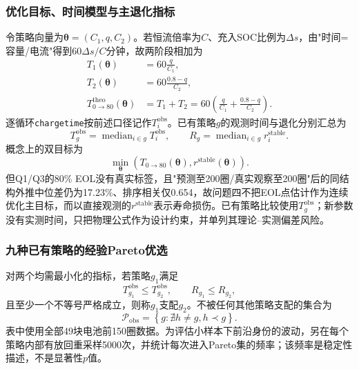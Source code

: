 \documentclass[withoutpreface]{cumcmthesis}
\begin{document}
\subsubsection{优化目标、时间模型与主退化指标}

令策略向量为$\boldsymbol\theta=(C_1,q,C_2)$。若恒流倍率为$C$、充入SOC比例为$\Delta s$，由"时间=容量/电流"得到$60\Delta s/C$分钟，故两阶段相加为
\begin{align}
T_1(\boldsymbol\theta)&=60\frac{q}{C_1},\\
T_2(\boldsymbol\theta)&=60\frac{0.8-q}{C_2},\\
T_{0\rightarrow80}^{\mathrm{theo}}(\boldsymbol\theta)
&=T_1+T_2
=60\left(\frac{q}{C_1}+\frac{0.8-q}{C_2}\right).
\end{align}
逐循环\texttt{chargetime}按前述口径记作$T_{i}^{\mathrm{obs}}$。已有策略$g$的观测时间与退化分别汇总为
\begin{equation}
T_g^{\mathrm{obs}}=\operatorname{median}_{i\in g}T_i^{\mathrm{obs}},
\qquad
R_g=\operatorname{median}_{i\in g}r_i^{\mathrm{stable}}.
\end{equation}
概念上的双目标为
\begin{equation}
\min_{\boldsymbol\theta}\left(
T_{0\rightarrow80}(\boldsymbol\theta),
r^{\mathrm{stable}}(\boldsymbol\theta)
\right).
\end{equation}
但Q1/Q3的80\% EOL没有真实标签，且"预测至200圈/真实观察至200圈"后的同结构外推中位差仍为17.23\%、排序相关仅0.654，故问题四不把EOL点估计作为连续优化主目标，而以直接观测的$r^{\mathrm{stable}}$表示寿命损伤。已有策略比较使用$T_g^{\mathrm{obs}}$；新参数没有实测时间，只把物理公式作为设计约束，并单列其理论--实测偏差风险。

\subsubsection{九种已有策略的经验Pareto优选}

对两个均需最小化的指标，若策略$g_1$满足
\begin{equation}
T_{g_1}^{\mathrm{obs}}\le T_{g_2}^{\mathrm{obs}},\qquad
R_{g_1}\le R_{g_2},
\end{equation}
且至少一个不等号严格成立，则称$g_1$支配$g_2$。不被任何其他策略支配的集合为
\begin{equation}
\mathcal P_{\mathrm{obs}}
=\left\{g:\nexists h\ne g, h\prec g\right\}.
\end{equation}
表中使用全部49块电池前150圈数据。为评估小样本下前沿身份的波动，另在每个策略内部有放回重采样5000次，并统计每次进入Pareto集的频率；该频率是稳定性描述，不是显著性$p$值。
\end{document}
